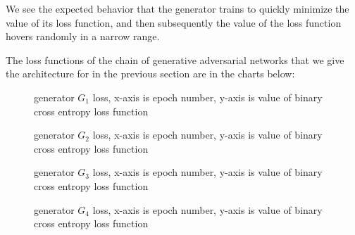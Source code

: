 \documentclass[conference]{IEEEtran}
\begin{document}
We see the expected behavior that the generator trains to quickly minimize the
value of its loss function, and then subsequently the value of the loss function
hovers randomly in a narrow range.

The loss functions of the chain of generative adversarial networks that we give
the architecture for in the previous section are in the charts below:

\begin{figure}[htpb]
\caption{generator $G_{1}$ loss, x-axis is epoch number, y-axis is 
value of binary cross entropy loss function }
\label{gen1Loss}
\end{figure}

\begin{figure}[htpb]
\caption{generator $G_{2}$ loss, x-axis is epoch number, y-axis is 
value of binary cross entropy loss function }
\label{gen2Loss}
\end{figure}

\begin{figure}[htpb]
\caption{generator $G_{3}$ loss, x-axis is epoch number, y-axis is 
value of binary cross entropy loss function }
\label{gen3Loss}
\end{figure}

\begin{figure}[htpb]
\caption{generator $G_{4}$ loss, x-axis is epoch number, y-axis is 
value of binary cross entropy loss function }
\label{gen4Loss}
\end{figure}
\end{document}
